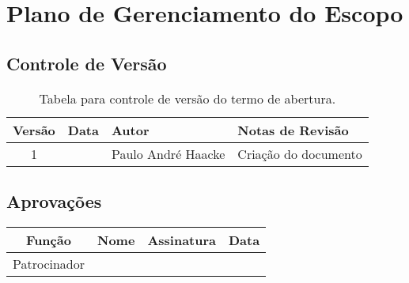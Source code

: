 \section{Plano de Gerenciamento do Escopo}

\subsection{Controle de Versão}

\begin{table}[H]
	\begin{tabularx}{.9\textwidth}{| c | c | X | X |}
		\hline
		\textbf{Versão} & \textbf{Data} & \textbf{Autor}      & \textbf{Notas de Revisão} \\
		\hline
		1                &     & Paulo André Haacke & Criação do documento     \\
		\hline
	\end{tabularx}
	\centering
	\caption{Tabela para controle de versão do termo de abertura.}
\end{table}

\subsection{Aprovações}

\begin{table}[H]
	\begin{tabularx}{\textwidth}{| c | c | X | c |}
		\hline
		\textbf{Função} & \textbf{Nome}       & \textbf{Assinatura}      & \textbf{Data} \\
		\hline
		Patrocinador      & \projectSponsorName & \projectSponsorSignature &               \\
		\hline
	\end{tabularx}
	\centering
\end{table}

